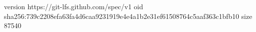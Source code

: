 version https://git-lfs.github.com/spec/v1
oid sha256:739c2208efa63fa4d6caa9231919e4e4a1b2e31ef61508764c5aaf363c1bfb10
size 87540
